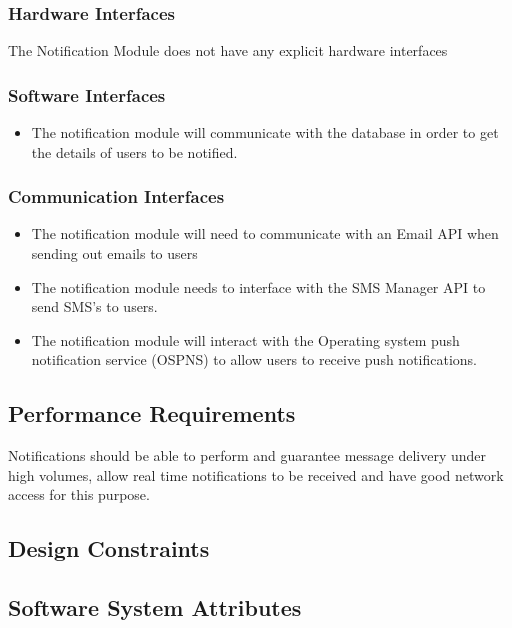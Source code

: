 \subsubsection{Hardware Interfaces}
The Notification Module does not have any explicit hardware interfaces

\subsubsection{Software Interfaces}
  \begin{itemize}
  	\item The notification module will communicate with the database in order to get the details of users to be notified.
  \end{itemize}
  
\subsubsection{Communication Interfaces}
	\begin{itemize}
		\item The notification module will need to communicate with an Email API when sending out emails to users
		\item The notification module needs to interface with the SMS Manager API to send SMS's to users.
		\item The notification module will interact with the Operating system push notification service (OSPNS) to allow users to receive push notifications.
	\end{itemize}
	
\subsection{Performance Requirements}
Notifications should be able to perform and guarantee message delivery under high volumes, allow real time notifications to be received and have good network access for this purpose. 

\subsection{Design Constraints}



\subsection{Software System Attributes}

